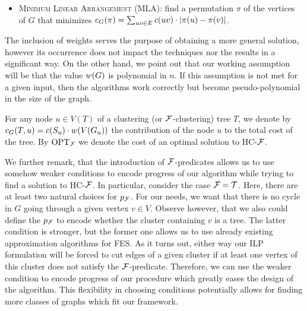 \begin{itemize}
\begin{enumerate}
    \item \textsc{$\rho$-Separator} (\textsc{$\rho$-SEP})\label{prob:rho-sep}: given a parameter $\rho\in(0,1)$ and an additional set $X\subseteq V$ of vertices, find a subset of edges $E'\subseteq E$ such that every connected component $H$ of $G\setminus E'$ with $V(H)\cap X\neq\emptyset$ satisfies $w\br{H}\leq\rho\cdot w\br{G}$ and $c\br{E'}$ is minimized. We call such an $E'$ a $(\rho,X)$-\emph{separator}. Here, the $\cF$-predicate informs whether the connected component of $G\setminus E'$ containing $v$ has the total vertex weight at most $\rho\cdot w\br{G}$. A bicriteria approximation algorithm for \textsc{$\rho$-SEP} with parameters $(\rho,\rho_0)$, where $0<\rho<\rho_0<1$, returns a subset of edges $E'$ such that $c\br{E'}$ is at most $\rho$ times more then the optimum and every connected component $H$ in $G\setminus E'$ with $H\cap X\neq\emptyset$ satisfies $w\br{H}\leq\rho_0\cdot w\br{G}$.
    \end{enumerate}
    \item \textsc{Minimum Linear Arrangement} (\textsc{MLA}): find a permutation $\pi$ of the vertices of $G$ that minimizes ${c}_G\mathopen{}\left( \pi \right) = \sum_{uv\in E} c(uv) \cdot \mathopen{}\left| \pi(u) - \pi(v) \right|$.
\end{itemize}

The inclusion of weights serves the purpose of obtaining a more general solution, however its occurrence does not impact the techniques nor the results in a significant way.
On the other hand, we point out that our working assumption will be that the value $w\mathopen{}\left( G \right)$ is polynomial in $n$.
If this assumption is not met for a given input, then the algorithms work correctly but become pseudo-polynomial in the size of the graph.

For any node $u\in V(T)$ of a clustering (or $\cF$-clustering) tree $T$, we denote by ${c}_G\mathopen{}\left( T, u \right) = c(S_u) \cdot w\mathopen{}\left( V\mathopen{}\left( G_u \right) \right)$ the contribution of the node $u$ to the total cost of the tree.
By $\text{OPT}_{\mathcal{F}}$ we denote the cost of an optimal solution to \textsc{HC-$\cF$}.

We further remark, that the introduction of $\cF$-predicates allows us to use somehow weaker conditions to encode progress of our algorithm while trying to find a solution to \textsc{HC-$\cF$}. In particular, consider the case $\mathcal{F}=\mathcal{T}$. Here, there are at least two natural choices for $p_{\mathcal{F}}$. For our needs, we want that there is no cycle in $G$ going through a given vertex $v\in V$. Observe however, that we also could define the $p_{\mathcal{F}}$ to encode whether the cluster containing $v$ is a tree. The latter condition is stronger, but the former one allows us to use already existing approximation algorithms for \textsc{FES}. As it turns out, either way our ILP formulation will be forced to cut edges of a given cluster if at least one vertex of this cluster does not satisfy the $\cF$-predicate. Therefore, we can use the weaker condition to encode progress of our procedure which greatly eases the design of the algorithm. This flexibility in choosing conditions potentially allows for finding more classes of graphs which fit our framework.
